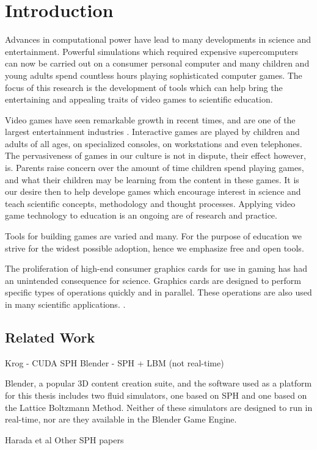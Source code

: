 \chapter{Introduction}

Advances in computational power have lead to many developments in science and
entertainment. Powerful simulations which required expensive supercomputers can
now be carried out on a consumer personal computer and many children and young
adults spend countless hours playing sophisticated computer games. The focus of
this research is the development of tools which can help bring the entertaining
and appealing traits of video games to scientific education.


Video games have seen remarkable growth in recent times, and are one of the
largest entertainment industries \cite{needed}. Interactive games are played by
children and adults of all ages, on specialized consoles, on workstations and
even telephones. The pervasiveness of games in our culture is not in dispute,
their effect however, is. Parents raise concern over the amount of time
children spend playing games, and what their children may be learning from the
content in these games. It is our desire then to help develope games which
encourage interest in science and teach scientific concepts, methodology and
thought processes. Applying video game technology to education is an ongoing
are of research and practice\cite{needed}. 


Tools for building games are varied and many. For the purpose of education we
strive for the widest possible adoption, hence we emphasize free and open
tools. 


The proliferation of high-end consumer graphics cards for use in gaming has had
an unintended consequence for science. Graphics cards are designed to perform
specific types of operations quickly and in parallel. These operations are also
used in many scientific applications.  .\cite{OpenCL}


\section{Related Work}

Krog - CUDA SPH
Blender - SPH + LBM (not real-time)

Blender, a popular 3D content creation suite, and the software used as a
platform for this thesis includes two fluid simulators, one based on SPH\cite{Clavet2005} and
one based on the Lattice Boltzmann Method\cite{Nils2006}. Neither of these simulators are
designed to run in real-time, nor are they available in the Blender Game
Engine. 


Harada et al
Other SPH papers

